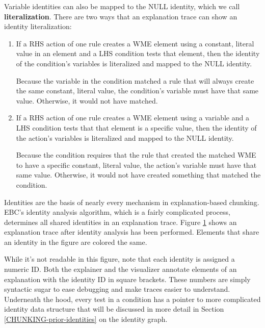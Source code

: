 Variable identities can also be mapped to the NULL identity, which we call \textbf{literalization}.  There are two ways that an explanation trace can show an identity literalization:

\begin{enumerate}
	\item If a RHS action of one rule creates a WME element using a constant, literal value in an element and a LHS condition tests that element, then the identity of the condition's variables is literalized and mapped to the NULL identity. 

	Because the variable in the condition matched a rule that will always create the same constant, literal value, the condition's variable must have that same value.  Otherwise, it would not have matched.
	\vspace{-6pt}
	
	\item If a RHS action of one rule creates a WME element using a variable and a LHS condition tests that that element is a specific value, then the identity of the action's variables is literalized and mapped to the NULL identity. 

	Because the condition requires that the rule that created the matched WME to have a specific constant, literal value, the action's variable must have that same value.  Otherwise, it would not have created something that matched the condition. 
\end{enumerate}

Identities are the basis of nearly every mechanism in explanation-based chunking.  EBC's identity analysis algorithm, which is a fairly complicated process, determines all shared identities in an explanation trace.  Figure \ref{fig:chunking-trace-identity} shows an explanation trace after identity analysis has been performed.  Elements that share an identity in the figure are colored the same.

\begin{figure}
	\caption{}
	\label{fig:chunking-trace-identity}
\end{figure}

While it's not readable in this figure, note that each identity is assigned a numeric ID.  Both the explainer and the visualizer annotate elements of an explanation with the identity ID in square brackets.  These numbers are simply syntactic sugar to ease debugging and make traces easier to understand.  Underneath the hood, every test in a condition has a pointer to more complicated identity data structure that will be discussed in more detail in Section \ref{CHUNKING-prior-identities} on the identity graph. 

